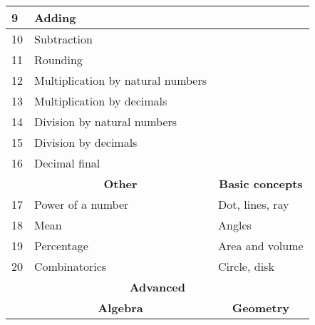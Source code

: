 \documentclass[a4paper]{article}
\begin{document}
\begin{center}
\begin{table}[]
\begin{tabular}{|lll|}
    \multicolumn{1}{|l|}{9}  & \multicolumn{1}{l|}{Adding}                            &                                              \\ \hline
    \multicolumn{1}{|l|}{10} & \multicolumn{1}{l|}{Subtraction}                       &                                              \\ \hline
    \multicolumn{1}{|l|}{11} & \multicolumn{1}{l|}{Rounding}                          &                                              \\ \hline
    \multicolumn{1}{|l|}{12} & \multicolumn{1}{l|}{Multiplication by natural numbers} &                                              \\ \hline
    \multicolumn{1}{|l|}{13} & \multicolumn{1}{l|}{Multiplication by decimals}        &                                              \\ \hline
    \multicolumn{1}{|l|}{14} & \multicolumn{1}{l|}{Division by natural numbers}       &                                              \\ \hline
    \multicolumn{1}{|l|}{15} & \multicolumn{1}{l|}{Division by decimals}              &                                              \\ \hline
    \multicolumn{1}{|l|}{16} & \multicolumn{1}{l|}{Decimal final}                     &                                              \\ \hline
    \multicolumn{1}{|l|}{}   & \multicolumn{1}{c|}{\textbf{Other}}                    & \multicolumn{1}{c|}{\textbf{Basic concepts}} \\ \hline
    \multicolumn{1}{|l|}{17} & \multicolumn{1}{l|}{Power of a number}                 & Dot, lines, ray                              \\ \hline
    \multicolumn{1}{|l|}{18} & \multicolumn{1}{l|}{Mean}                              & Angles                                       \\ \hline
    \multicolumn{1}{|l|}{19} & \multicolumn{1}{l|}{Percentage}                        & Area and volume                              \\ \hline
    \multicolumn{1}{|l|}{20} & \multicolumn{1}{l|}{Combinatorics}                     & Circle, disk                                 \\ \hline
    \multicolumn{3}{|c|}{\textbf{Advanced}}                                                                                          \\ \hline
    \multicolumn{1}{|l|}{}   & \multicolumn{1}{c|}{\textbf{Algebra}}                  & \multicolumn{1}{c|}{\textbf{Geometry}}       \\ \hline

\end{tabular}
\end{table}
\end{center}
\end{document}
